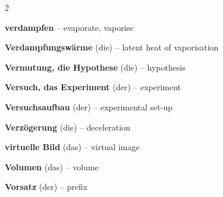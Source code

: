 \begin{multicols}{2}
\par\nopagebreak
\textbf{verdampfen} -- evaporate, vaporise\dotfill\hyperref[e:131]{\pageref*{e:131}}\par
\textbf{Verdampfungswärme} (die) -- latent heat of vaporisation\dotfill\hyperref[e:138]{\pageref*{e:138}}\par
\textbf{Vermutung, die Hypothese} (die) -- hypothesis\dotfill\hyperref[e:20]{\pageref*{e:20}}\par
\textbf{Versuch, das Experiment} (der) -- experiment\dotfill\hyperref[e:16]{\pageref*{e:16}}\par
\textbf{Versuchsaufbau} (der) -- experimental set-up\dotfill\hyperref[e:17]{\pageref*{e:17}}\par
\textbf{Verzögerung} (die) -- deceleration\dotfill\hyperref[e:41]{\pageref*{e:41}}\par
\textbf{virtuelle Bild} (das) -- virtual image\dotfill\hyperref[e:251]{\pageref*{e:251}}\par
\textbf{Volumen} (das) -- volume\dotfill\hyperref[e:57]{\pageref*{e:57}}\par
\textbf{Vorsatz} (der) -- prefix\dotfill\hyperref[e:7]{\pageref*{e:7}}\par


\end{multicols}
